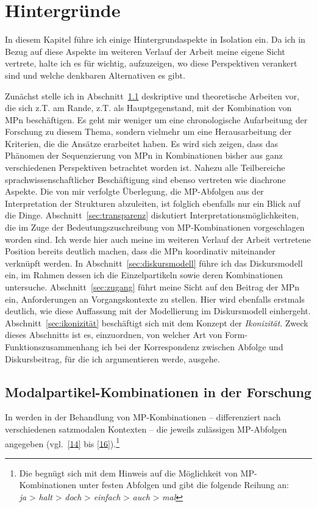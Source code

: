 \chapter{Hintergründe}
\label{chapter:hintergrund}
In diesem Kapitel führe ich einige Hintergrundaspekte in Isolation ein. Da ich in Bezug auf diese Aspekte im weiteren Verlauf der Arbeit meine eigene Sicht vertrete, halte ich es für wichtig, aufzuzeigen, wo diese Perspektiven verankert sind und welche denkbaren Alternativen es gibt.

Zunächst stelle ich in Abschnitt~\ref{sec:forschung} deskriptive und theoretische Arbeiten vor, die sich z.T. am Rande, z.T. als Hauptgegenstand, mit der Kombination von MPn beschäftigen. Es geht mir weniger um eine chronologische Aufarbeitung der Forschung zu diesem Thema, sondern vielmehr um eine Herausarbeitung der Kriterien, die die Ansätze erarbeitet haben. Es wird sich zeigen, dass das Phänomen der Sequenzierung von MPn in Kombinationen bisher aus ganz verschiedenen Perspektiven betrachtet worden ist. Nahezu alle Teilbereiche sprachwissenschaft\-licher Beschäftigung sind ebenso vertreten wie diachrone Aspekte. Die von mir verfolgte Überlegung, die MP-Abfolgen aus der Interpretation der Strukturen abzuleiten, ist folglich ebenfalls nur ein Blick auf die Dinge. Abschnitt~\ref{sec:transparenz} diskutiert Interpretationsmöglichkeiten, die im Zuge der Bedeutungszuschreibung von MP-Kombina\-tionen vorgeschlagen worden sind. Ich werde hier auch meine im weiteren Verlauf der Arbeit vertretene Position bereits deutlich machen, dass die MPn koordinativ miteinander verknüpft werden. In Abschnitt~\ref{sec:diskursmodell} führe ich das Diskursmodell ein, im Rahmen dessen ich die Einzelpartikeln sowie deren Kombinationen untersuche. Abschnitt~\ref{sec:zugang} führt meine Sicht auf den Beitrag der MPn ein, Anforderungen an Vorgangskontexte zu stellen. Hier wird ebenfalls erstmals deutlich, wie diese Auffassung mit der Modellierung im Diskursmodell einhergeht. Abschnitt~\ref{sec:ikonizität} beschäftigt sich mit dem Konzept der \textit{Ikonizität}. Zweck dieses Abschnitts ist es, einzuordnen, von welcher Art von Form-Funktionszusam\-menhang ich bei der Korrespondenz zwischen Abfolge und Diskursbeitrag, für die ich argumentieren werde, ausgehe.\pagebreak

\section{Modalpartikel-Kombinationen in der Forschung}
\label{sec:forschung}
In \citet[1542--1545]{Zifonun1997} werden in der Behandlung von MP-Kom\-bi\-na\-ti\-on\-en – differenziert nach verschiedenen satzmodalen Kontexten – die jeweils zulässigen MP-Abfolgen angegeben (vgl.\ \ref{14} bis \ref{16}).\footnote{Die \citet[594]{Duden2009} begnügt sich mit dem Hinweis auf die Möglichkeit von MP-Kom\-bi\-na\-ti\-on\-en unter festen Abfolgen und gibt die folgende Reihung an: \\
\textit{ja} > \textit{halt} > \textit{doch} > \textit{einfach} > \textit{auch} > \textit{mal}}


